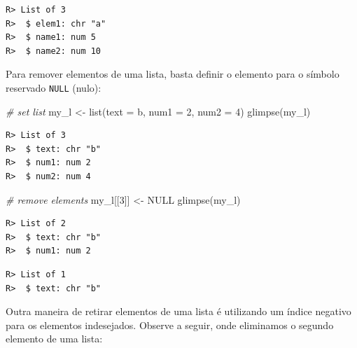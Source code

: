 \documentclass[
  11pt,
]{book}
\newenvironment{Shaded}{\begin{snugshade}}{\end{snugshade}}
\newcommand{\AttributeTok}[1]{\textcolor[rgb]{0.61,0.61,0.61}{#1}}
\newcommand{\CommentTok}[1]{\textcolor[rgb]{0.37,0.37,0.37}{\textit{#1}}}
\newcommand{\ConstantTok}[1]{\textcolor[rgb]{0,0,0}{#1}}
\newcommand{\DecValTok}[1]{\textcolor[rgb]{0.06,0.06,0.06}{#1}}
\newcommand{\FunctionTok}[1]{\textcolor[rgb]{0,0,0}{#1}}
\newcommand{\NormalTok}[1]{#1}
\newcommand{\OtherTok}[1]{\textcolor[rgb]{0.37,0.37,0.37}{#1}}
\newcommand{\SpecialCharTok}[1]{\textcolor[rgb]{0,0,0}{#1}}
\newcommand{\StringTok}[1]{\textcolor[rgb]{0.5,0.5,0.5}{#1}}
\begin{document}
\begin{verbatim}
R> List of 3
R>  $ elem1: chr "a"
R>  $ name1: num 5
R>  $ name2: num 10
\end{verbatim}

Para remover elementos de uma lista, basta definir o elemento para o símbolo reservado \texttt{NULL} (nulo):

\begin{Shaded}
\begin{Highlighting}[]
\CommentTok{\# set list}
\NormalTok{my\_l }\OtherTok{\textless{}{-}} \FunctionTok{list}\NormalTok{(}\AttributeTok{text =} \StringTok{\textquotesingle{}b\textquotesingle{}}\NormalTok{, }\AttributeTok{num1 =} \DecValTok{2}\NormalTok{, }\AttributeTok{num2 =} \DecValTok{4}\NormalTok{)}
\FunctionTok{glimpse}\NormalTok{(my\_l)}
\end{Highlighting}
\end{Shaded}

\begin{verbatim}
R> List of 3
R>  $ text: chr "b"
R>  $ num1: num 2
R>  $ num2: num 4
\end{verbatim}

\begin{Shaded}
\begin{Highlighting}[]
\CommentTok{\# remove elements}
\NormalTok{my\_l[[}\DecValTok{3}\NormalTok{]] }\OtherTok{\textless{}{-}} \ConstantTok{NULL}
\FunctionTok{glimpse}\NormalTok{(my\_l)}
\end{Highlighting}
\end{Shaded}

\begin{verbatim}
R> List of 2
R>  $ text: chr "b"
R>  $ num1: num 2
\end{verbatim}

\begin{Shaded}
\end{Shaded}

\begin{verbatim}
R> List of 1
R>  $ text: chr "b"
\end{verbatim}

Outra maneira de retirar elementos de uma lista é utilizando um índice negativo para os elementos indesejados. Observe a seguir, onde eliminamos o segundo elemento de uma lista:
\end{document}
